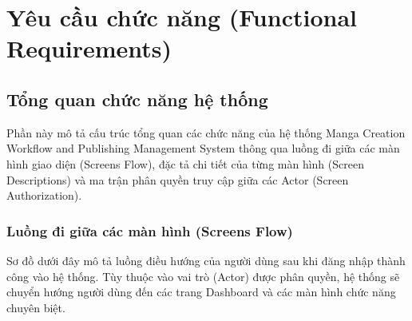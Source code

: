 \section{Yêu cầu chức năng (Functional Requirements)}
\label{sec:srs_functional_requirements}

\subsection{Tổng quan chức năng hệ thống}
\label{subsec:srs_functional_overview}

Phần này mô tả cấu trúc tổng quan các chức năng của hệ thống Manga Creation Workflow and Publishing Management System thông qua luồng đi giữa các màn hình giao diện (Screens Flow), đặc tả chi tiết của từng màn hình (Screen Descriptions) và ma trận phân quyền truy cập giữa các Actor (Screen Authorization).

\subsubsection{Luồng đi giữa các màn hình (Screens Flow)}
Sơ đồ dưới đây mô tả luồng điều hướng của người dùng sau khi đăng nhập thành công vào hệ thống. Tùy thuộc vào vai trò (Actor) được phân quyền, hệ thống sẽ chuyển hướng người dùng đến các trang Dashboard và các màn hình chức năng chuyên biệt.

